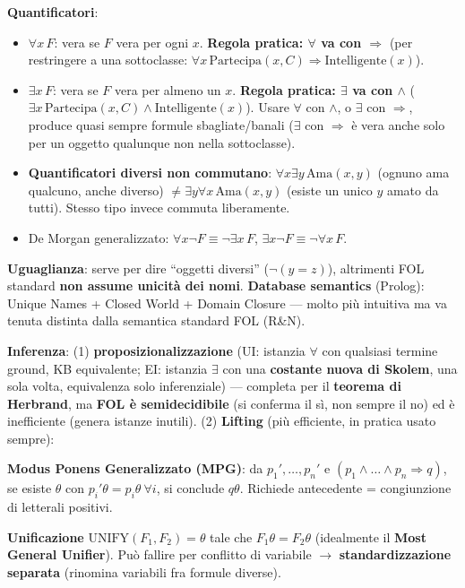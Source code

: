 \documentclass[10pt,a4paper]{article}
\begin{document}
\textbf{Quantificatori}:
\begin{itemize}
  \item $\forall x\, F$: vera se $F$ vera per ogni $x$. \textbf{Regola pratica: $\forall$ va con $\Rightarrow$} (per restringere a una sottoclasse: $\forall x\, \text{Partecipa}(x,C)\Rightarrow\text{Intelligente}(x)$).
  \item $\exists x\, F$: vera se $F$ vera per almeno un $x$. \textbf{Regola pratica: $\exists$ va con $\wedge$} ($\exists x\, \text{Partecipa}(x,C)\wedge\text{Intelligente}(x)$). Usare $\forall$ con $\wedge$, o $\exists$ con $\Rightarrow$, produce quasi sempre formule sbagliate/banali ($\exists$ con $\Rightarrow$ è vera anche solo per un oggetto qualunque non nella sottoclasse).
  \item \textbf{Quantificatori diversi non commutano}: $\forall x\exists y\, \text{Ama}(x,y)$ (ognuno ama qualcuno, anche diverso) $\neq \exists y\forall x\, \text{Ama}(x,y)$ (esiste un unico $y$ amato da tutti). Stesso tipo invece commuta liberamente.
  \item De Morgan generalizzato: $\forall x \neg F \equiv \neg\exists x\, F$, $\exists x \neg F \equiv \neg\forall x\, F$.
\end{itemize}

\textbf{Uguaglianza}: serve per dire ``oggetti diversi'' ($\neg(y=z)$), altrimenti FOL standard \textbf{non assume unicità dei nomi}. \textbf{Database semantics} (Prolog): Unique Names + Closed World + Domain Closure --- molto più intuitiva ma va tenuta distinta dalla semantica standard FOL (R\&N).

\textbf{Inferenza}: (1) \textbf{proposizionalizzazione} (UI: istanzia $\forall$ con qualsiasi termine ground, KB equivalente; EI: istanzia $\exists$ con una \textbf{costante nuova di Skolem}, una sola volta, equivalenza solo inferenziale) --- completa per il \textbf{teorema di Herbrand}, ma \textbf{FOL è semidecidibile} (si conferma il sì, non sempre il no) ed è inefficiente (genera istanze inutili). (2) \textbf{Lifting} (più efficiente, in pratica usato sempre):

\textbf{Modus Ponens Generalizzato (MPG)}: da $p_1',\dots,p_n'$ e $(p_1\wedge\dots\wedge p_n\Rightarrow q)$, se esiste $\theta$ con $p_i'\theta=p_i\theta\ \forall i$, si conclude $q\theta$. Richiede antecedente = congiunzione di letterali positivi.

\textbf{Unificazione} $\text{UNIFY}(F_1,F_2)=\theta$ tale che $F_1\theta=F_2\theta$ (idealmente il \textbf{Most General Unifier}). Può fallire per conflitto di variabile $\to$ \textbf{standardizzazione separata} (rinomina variabili fra formule diverse).
\end{document}
